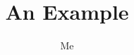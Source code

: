 \documentclass{report}
\title{An Example}
\author{Me}
\begin{document}
\maketitle




\printunsrtglossary
\end{document}

